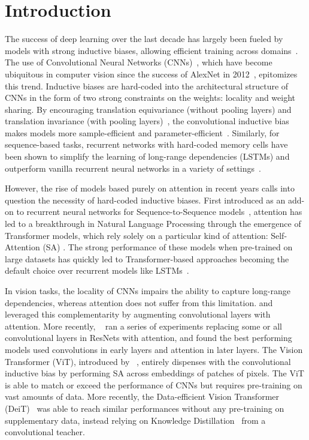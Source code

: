 \section{Introduction}

The success of deep learning over the last decade has largely been fueled by models with strong inductive biases, allowing efficient training across domains~\cite{mitchell1980need,goodfellow_deep_2016}. The use of Convolutional Neural Networks (CNNs)~\cite{lecun1998gradient,lecun1989backpropagation}, which have become ubiquitous in computer vision since the success of AlexNet in 2012~\cite{krizhevsky2017imagenet}, epitomizes this trend. Inductive biases are hard-coded into the architectural structure of CNNs in the form of two strong constraints on the weights: locality and weight sharing. By encouraging translation equivariance (without pooling layers) and translation invariance (with pooling layers)~\cite{scherer_evaluation_2010,schmidhuber_deep_2015,goodfellow_deep_2016}, the convolutional inductive bias makes models more sample-efficient and parameter-efficient~\cite{simoncelli2001natural,ruderman1994statistics}. Similarly, for sequence-based tasks, recurrent networks with hard-coded memory cells have been shown to simplify the learning of long-range dependencies (LSTMs) and outperform vanilla recurrent neural networks in a variety of settings~\cite{gers1999learning,sundermeyer_lstm_2012,greff_lstm_2017}.

However, the rise of models based purely on attention in recent years calls into question the necessity of hard-coded inductive biases. First introduced as an add-on to recurrent neural networks for Sequence-to-Sequence models~\cite{bahdanau2014neural}, attention has led to a breakthrough in Natural Language Processing through the emergence of Transformer models, which rely solely on a particular kind of attention: Self-Attention (SA) \cite{vaswani2017attention}. The strong performance of these models when pre-trained on large datasets has quickly led to Transformer-based approaches becoming the default choice over recurrent models like LSTMs~\cite{devlin2018bert}.

In vision tasks, the locality of CNNs impairs the ability to capture long-range dependencies, whereas attention does not suffer from this limitation. \citet{chen20182} and ~\citet{bello2019attention} leveraged this complementarity by augmenting convolutional layers with attention. More recently, ~\citet{ramachandran2019stand} ran a series of experiments replacing some or all convolutional layers in ResNets with attention, and found the best performing models used convolutions in early layers and attention in later layers. The Vision Transformer (ViT), introduced by ~\citet{dosovitskiy2020image}, entirely dispenses with the convolutional inductive bias by performing SA across embeddings of patches of pixels. The ViT is able to match or exceed the performance of CNNs but requires pre-training on vast amounts of data. More recently, the Data-efficient Vision Transformer (DeiT)~\cite{touvron2020training} was able to reach similar performances without any pre-training on supplementary data, instead relying on Knowledge Distillation~\cite{hinton2015distilling} from a convolutional teacher.

